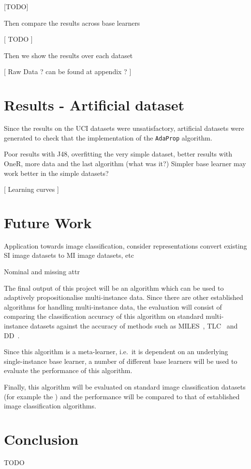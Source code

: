 \documentclass[a4paper,12pt]{article} %
\newcommand{\AdaProp}{\texttt{AdaProp}\xspace}
\begin{document}
[TODO]

Then compare the results across base learners 

[ TODO ]

Then we show the results over each dataset

[ Raw Data ? can be found at appendix ? ]    
    


\section{Results - Artificial dataset}
Since the results on the UCI datasets were unsatisfactory, 
    artificial datasets were generated to check that the 
    implementation of the \AdaProp algorithm.
    
Poor results with J48, overfitting the very simple dataset, better results with 
    OneR, more data and the last algorithm (what was it?)
Simpler base learner may work better in the simple datasets?

[ Learning curves ]


\section{Future Work}
Application towards image classification, consider representations
    convert existing SI image datasets to MI image datasets, etc

Nominal and missing attr

The final output of this project will be an algorithm which can be used to adaptively propositionalise multi-instance data. Since there are other established algorithms for handling multi-instance data, the evaluation will consist of comparing the classification accuracy of this algorithm on standard multi-instance datasets against the accuracy of methods such as MILES~\cite{Chen2006}, TLC~\cite{Weidmann2003} and DD~\cite{Maron98mil}.

Since this algorithm is a meta-learner, i.e.\ it is dependent on an underlying single-instance base learner, a number of different base learners will be used to evaluate the performance of this algorithm.
 
Finally, this algorithm will be evaluated on standard image classification datasets (for example the ) and the performance will be compared to that of established image classification algorithms.


\section{Conclusion}
TODO
\end{document}
